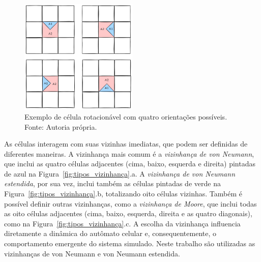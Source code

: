 \documentclass[12pt,oneside]{report}
\begin{document}
\begin{figure}[H]
    \centering
    \includegraphics[width=0.5\textwidth]{img/componente_rotaciona.png}
    \caption{\small Exemplo de célula rotacionável com quatro orientações possíveis. Fonte: Autoria própria.}
    \label{fig:celula_rotacionavel}
\end{figure}

As células interagem com suas vizinhas imediatas, que podem ser definidas de diferentes maneiras. A vizinhança mais comum é a \textit{vizinhança de von Neumann}, que inclui as quatro células adjacentes (cima, baixo, esquerda e direita) pintadas de azul na Figura~\ref{fig:tipos_vizinhança}.a. A \textit{vizinhança de von Neumann estendida}, por sua vez, inclui também as células pintadas de verde na Figura~\ref{fig:tipos_vizinhança}.b, totalizando oito células vizinhas. Também é possível definir outras vizinhanças, como a \textit{vizinhança de Moore}, que inclui todas as oito células adjacentes (cima, baixo, esquerda, direita e as quatro diagonais), como na Figura~\ref{fig:tipos_vizinhança}.c. A escolha da vizinhança influencia diretamente a dinâmica do autômato celular e, consequentemente, o comportamento emergente do sistema simulado. Neste trabalho são utilizadas as vizinhanças de von Neumann e von Neumann estendida.
\end{document}
